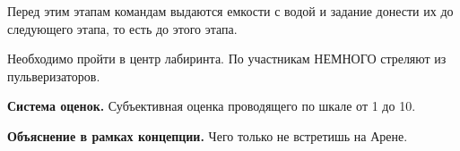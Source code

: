 \par Перед этим этапам командам выдаются емкости с водой и задание донести их до следующего этапа, то есть до этого этапа.

\par Необходимо пройти в центр лабиринта. По участникам НЕМНОГО стреляют из пульверизаторов.

\par \textbf{Система оценок.} Субъективная оценка проводящего по шкале от 1 до 10.

\par \textbf{Объяснение в рамках концепции.} Чего только не встретишь на Арене.
